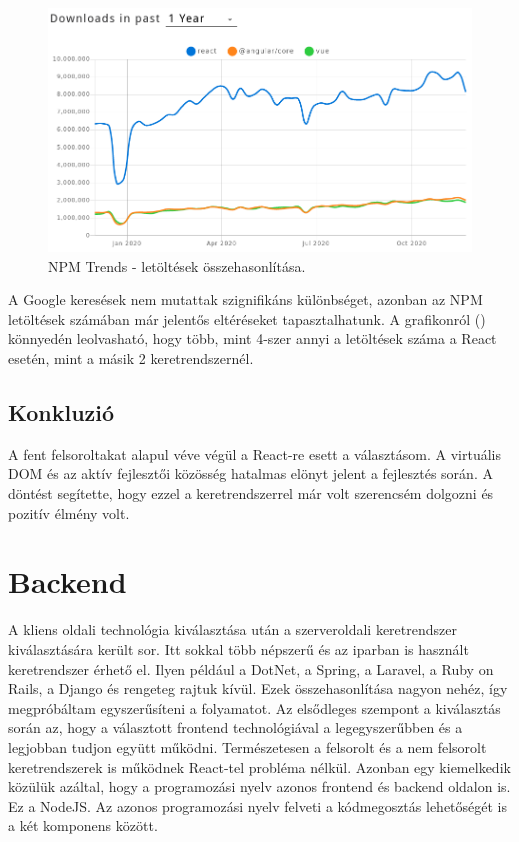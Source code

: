 \begin{figure}[!ht]
  \centering
  \includegraphics[width=150mm, keepaspectratio]{figures/npm_trends.png}
  \caption{NPM Trends - letöltések összehasonlítása.}
  \label{fig:NPMTrends}
\end{figure}

A Google keresések nem mutattak szignifikáns különbséget, azonban az NPM letöltések számában már jelentős eltéréseket tapasztalhatunk. A grafikonról () könnyedén leolvasható, hogy több, mint 4-szer annyi a letöltések száma a React esetén, mint a másik 2 keretrendszernél.

\subsection{Konkluzió}
A fent felsoroltakat alapul véve végül a React-re esett a választásom. A virtuális DOM és az aktív fejlesztői közösség hatalmas elönyt jelent a fejlesztés során. A döntést segítette, hogy ezzel a keretrendszerrel már volt szerencsém dolgozni és pozitív élmény volt.

\section{Backend}

A kliens oldali technológia kiválasztása után a szerveroldali keretrendszer kiválasztására került sor.
Itt sokkal több népszerű és az iparban is használt keretrendszer érhető el. Ilyen például a DotNet, a Spring, a Laravel, a Ruby on Rails, a Django és rengeteg rajtuk kívül. Ezek összehasonlítása nagyon nehéz, így megpróbáltam egyszerűsíteni a folyamatot. Az elsődleges szempont a kiválasztás során az, hogy a választott frontend technológiával a legegyszerűbben és a legjobban tudjon együtt működni. Természetesen a felsorolt és a nem felsorolt keretrendszerek is működnek React-tel probléma nélkül. Azonban egy kiemelkedik közülük azáltal, hogy a programozási nyelv azonos frontend és backend oldalon is. Ez a NodeJS. Az azonos programozási nyelv felveti a kódmegosztás lehetőségét is a két komponens között. 

